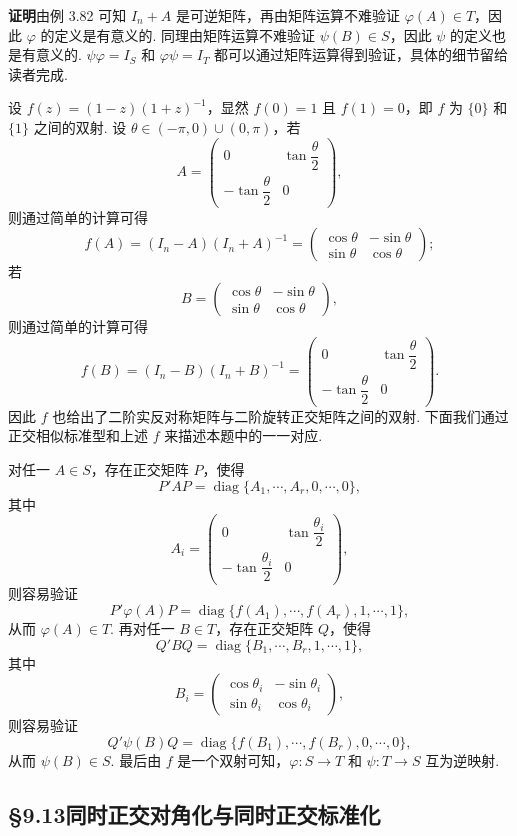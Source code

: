 \documentclass[UTF8,12pt,a4paper,fontset=fandol]{ctexart}
\begin{document}
\noindent\textbf{证明}\quad 由例 3.82 可知 $I_n+A$ 是可逆矩阵，再由矩阵运算不难验证 $\varphi(A)\in T$，因此 $\varphi$ 的定义是有意义的. 同理由矩阵运算不难验证 $\psi(B)\in S$，因此 $\psi$ 的定义也是有意义的. $\psi\varphi=I_S$ 和 $\varphi\psi=I_T$ 都可以通过矩阵运算得到验证，具体的细节留给读者完成.

设 $f(z)=(1-z)(1+z)^{-1}$，显然 $f(0)=1$ 且 $f(1)=0$，即 $f$ 为 $\{0\}$ 和 $\{1\}$ 之间的双射. 设 $\theta\in(-\pi,0)\cup(0,\pi)$，若
\[
A=\begin{pmatrix}
0&\tan\dfrac{\theta}{2}\\
-\tan\dfrac{\theta}{2}&0
\end{pmatrix},
\]
则通过简单的计算可得
\[
f(A)=(I_n-A)(I_n+A)^{-1}
=\begin{pmatrix}
\cos\theta&-\sin\theta\\
\sin\theta&\cos\theta
\end{pmatrix};
\]
若
\[
B=\begin{pmatrix}
\cos\theta&-\sin\theta\\
\sin\theta&\cos\theta
\end{pmatrix},
\]
则通过简单的计算可得
\[
f(B)=(I_n-B)(I_n+B)^{-1}
=\begin{pmatrix}
0&\tan\dfrac{\theta}{2}\\
-\tan\dfrac{\theta}{2}&0
\end{pmatrix}.
\]
因此 $f$ 也给出了二阶实反对称矩阵与二阶旋转正交矩阵之间的双射. 下面我们通过正交相似标准型和上述 $f$ 来描述本题中的一一对应.

对任一 $A\in S$，存在正交矩阵 $P$，使得
\[
P'AP=\operatorname{diag}\{A_1,\cdots,A_r,0,\cdots,0\},
\]
其中
\[
A_i=\begin{pmatrix}
0&\tan\dfrac{\theta_i}{2}\\
-\tan\dfrac{\theta_i}{2}&0
\end{pmatrix},
\]
则容易验证
\[
P'\varphi(A)P=\operatorname{diag}\{f(A_1),\cdots,f(A_r),1,\cdots,1\},
\]
从而 $\varphi(A)\in T$. 再对任一 $B\in T$，存在正交矩阵 $Q$，使得
\[
Q'BQ=\operatorname{diag}\{B_1,\cdots,B_r,1,\cdots,1\},
\]
其中
\[
B_i=\begin{pmatrix}
\cos\theta_i&-\sin\theta_i\\
\sin\theta_i&\cos\theta_i
\end{pmatrix},
\]
则容易验证
\[
Q'\psi(B)Q=\operatorname{diag}\{f(B_1),\cdots,f(B_r),0,\cdots,0\},
\]
从而 $\psi(B)\in S$. 最后由 $f$ 是一个双射可知，$\varphi:S\to T$ 和 $\psi:T\to S$ 互为逆映射.

\subsection*{§9.13\quad 同时正交对角化与同时正交标准化}
\end{document}
